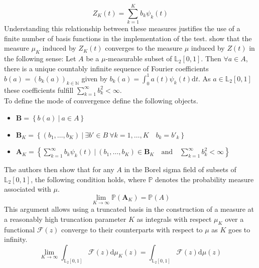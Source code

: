 \documentclass[12pt, a4paper]{article}
\theoremstyle{MAstyle} \newtheorem{assumption}{Assumption}[section]
\theoremstyle{MAstyle} \newtheorem{definition}{Definition}[section]
\theoremstyle{MAstyle} \newtheorem{theorem}{Theorem}[section]
\begin{document}
			\begin{equation}\label{finite_sum}
				Z_K(t) = \sum_{k = 1}^{K} b_k \psi_k(t)
			\end{equation}
			Understanding this relationship between these measures justifies the use of a finite number of basis functions in the implementation of the test.
			\cite{bugni_goodness--fit_2009} show that the measure $\mu_K$ induced by $Z_K(t)$ converges to the measure $\mu$ induced by $Z(t)$ in the following sense: Let $A$ be a $\mu$-measurable subset of $\mathbb{L}_2[0,1]$. Then $\forall a \in A$, there is a unique countably infinite sequence of Fourier coefficients $b(a) = (b_k(a))_{k \in \mathbb{N}}$ given by $b_k(a) = \int_{0}^{1} a(t) \psi_k(t) \mathrm{d}t$. As $a \in \mathbb{L}_2[0,1]$ these coefficients fulfill $\sum_{k = 1}^{\infty} b_k^2 < \infty$. \\
			
			To define the mode of convergence \cite{bugni_goodness--fit_2009} define the following objects.
			\begin{itemize}
				\item $\textbf{B} = \left\{b(a) \ \vert \ a \in A\right\}$
				\item $\textbf{B}_K = \left\{\left(b_1, \dots, b_K \right) \ \vert \ \exists b' \in B \  \forall k = 1, \dots, K \quad b_k = b'_k \right\}$
				\item $\textbf{A}_K = \left\{ \sum_{k = 1}^{\infty} b_k \psi_k(t) \ \vert \ \left(b_1, \dots, b_K \right) \in \textbf{B}_K \quad \text{and} \quad \sum_{k = 1}^{\infty} b_k^2 < \infty \right\}$
			\end{itemize}
			The authors then show that for any $A$ in the Borel sigma field of subsets of $\mathbb{L}_2[0,1]$, the following condition holds, where $\mathbb{P}$ denotes the probability measure associated with $\mu$.
			\begin{equation}
				\lim_{K \rightarrow \infty} \mathbb{P}(\textbf{A}_K) = \mathbb{P}(A)
			\end{equation}
			This argument allows using a truncated basis in the construction of a measure at a reasonably high truncation parameter $K$ as integrals with respect $\mu_K$ over a functional $\mathcal{F}(z)$ converge to their counterparts with respect to $\mu$ as $K$ goes to infinity.
			\begin{equation}
				\lim_{K \rightarrow \infty} \int_{\mathbb{L}_2[0,1]} \mathcal{F}(z) \mathrm{d}\mu_K(z) = \int_{\mathbb{L}_2[0,1]} \mathcal{F}(z) \mathrm{d}\mu(z)
			\end{equation}
			
\end{document}
